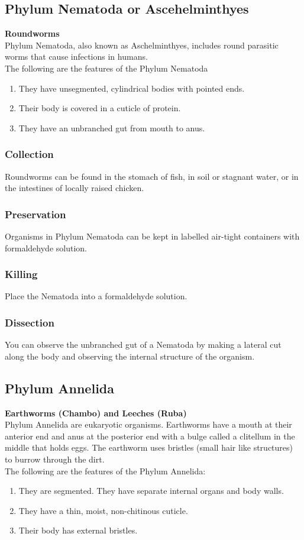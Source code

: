 \subsection{Phylum Nematoda or Ascehelminthyes}
\textbf{Roundworms}\\
Phylum Nematoda, also known as Aschelminthyes, includes round parasitic worms that cause infections in humans.\\
The following are the features of the Phylum Nematoda 
\begin{enumerate}
\item{They have unsegmented, cylindrical bodies with pointed ends.}
\item{Their body is covered in a cuticle of protein.}
\item{They have an unbranched gut from mouth to anus.}
\end{enumerate}

\subsubsection{Collection}
Roundworms can be found in the stomach of fish, in soil or stagnant water, or in the intestines of locally raised chicken.

\subsubsection{Preservation} 
Organisms in Phylum Nematoda can be kept in labelled air-tight containers with formaldehyde solution.

\subsubsection{Killing}
Place the Nematoda into a formaldehyde solution.

\subsubsection{Dissection}
You can observe the unbranched gut of a Nematoda by making a lateral cut along the body and observing the internal structure of the organism.

\subsection{Phylum Annelida}
\textbf{Earthworms (Chambo) and Leeches (Ruba)}\\ 
Phylum Annelida are eukaryotic organisms. Earthworms have a mouth at their anterior end and anus at the posterior end with a bulge called a clitellum in the middle that holds eggs. The earthworm uses bristles (small hair like structures) to burrow through the dirt. \\
The following are the features of the Phylum Annelida:
\begin{enumerate}
\item{They are segmented. They have separate internal organs and body walls.}
\item{They have a thin, moist, non-chitinous cuticle.}
\item{Their body has external bristles.}
\end{enumerate}

